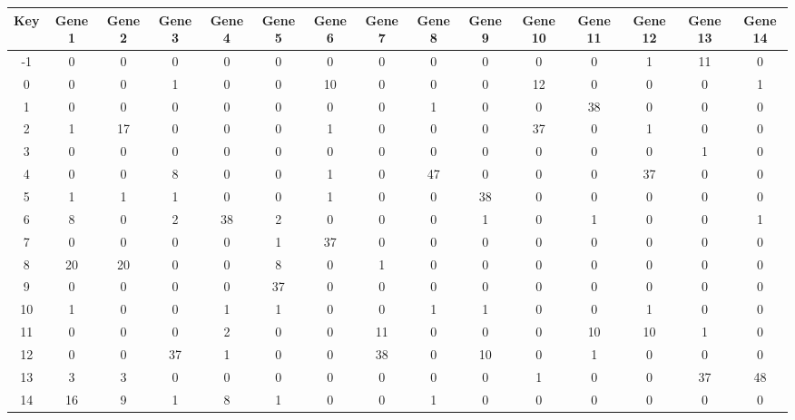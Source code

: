 \begin{tabular}{|c|c|c|c|c|c|c|c|c|c|c|c|c|c|c|}
\hline
Key & Gene 1 & Gene 2 & Gene 3 & Gene 4 & Gene 5 & Gene 6 & Gene 7 & Gene 8 & Gene 9 & Gene 10 & Gene 11 & Gene 12 & Gene 13 & Gene 14 \\
\hline
-1 & 0 & 0 & 0 & 0 & 0 & 0 & 0 & 0 & 0 & 0 & 0 & 1 & 11 & 0 \\
0 & 0 & 0 & 1 & 0 & 0 & 10 & 0 & 0 & 0 & 12 & 0 & 0 & 0 & 1 \\
1 & 0 & 0 & 0 & 0 & 0 & 0 & 0 & 1 & 0 & 0 & 38 & 0 & 0 & 0 \\
2 & 1 & 17 & 0 & 0 & 0 & 1 & 0 & 0 & 0 & 37 & 0 & 1 & 0 & 0 \\
3 & 0 & 0 & 0 & 0 & 0 & 0 & 0 & 0 & 0 & 0 & 0 & 0 & 1 & 0 \\
4 & 0 & 0 & 8 & 0 & 0 & 1 & 0 & 47 & 0 & 0 & 0 & 37 & 0 & 0 \\
5 & 1 & 1 & 1 & 0 & 0 & 1 & 0 & 0 & 38 & 0 & 0 & 0 & 0 & 0 \\
6 & 8 & 0 & 2 & 38 & 2 & 0 & 0 & 0 & 1 & 0 & 1 & 0 & 0 & 1 \\
7 & 0 & 0 & 0 & 0 & 1 & 37 & 0 & 0 & 0 & 0 & 0 & 0 & 0 & 0 \\
8 & 20 & 20 & 0 & 0 & 8 & 0 & 1 & 0 & 0 & 0 & 0 & 0 & 0 & 0 \\
9 & 0 & 0 & 0 & 0 & 37 & 0 & 0 & 0 & 0 & 0 & 0 & 0 & 0 & 0 \\
10 & 1 & 0 & 0 & 1 & 1 & 0 & 0 & 1 & 1 & 0 & 0 & 1 & 0 & 0 \\
11 & 0 & 0 & 0 & 2 & 0 & 0 & 11 & 0 & 0 & 0 & 10 & 10 & 1 & 0 \\
12 & 0 & 0 & 37 & 1 & 0 & 0 & 38 & 0 & 10 & 0 & 1 & 0 & 0 & 0 \\
13 & 3 & 3 & 0 & 0 & 0 & 0 & 0 & 0 & 0 & 1 & 0 & 0 & 37 & 48 \\
14 & 16 & 9 & 1 & 8 & 1 & 0 & 0 & 1 & 0 & 0 & 0 & 0 & 0 & 0 \\
\hline
\end{tabular}